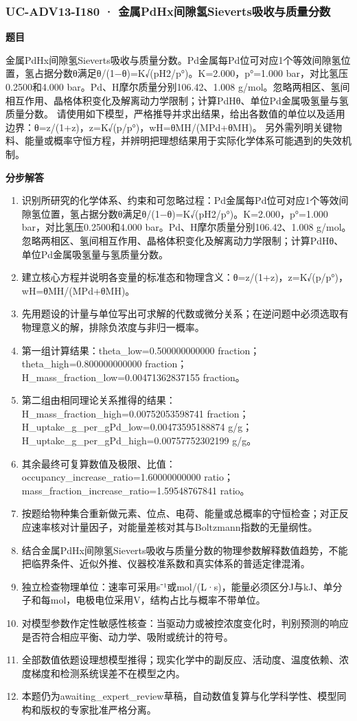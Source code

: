 \documentclass[UTF8,11pt,a4paper]{ctexart}
\begin{document}
\subsubsection*{UC-ADV13-I180 · 金属PdHx间隙氢Sieverts吸收与质量分数}
\noindent\textbf{题目}\par
金属PdHx间隙氢Sieverts吸收与质量分数。Pd金属每Pd位可对应1个等效间隙氢位置，氢占据分数θ满足θ/(1−θ)=K√(pH2/p°)。K=2.000，p°=1.000 bar，对比氢压0.2500和4.000 bar。Pd、H摩尔质量分别106.42、1.008 g/mol。忽略两相区、氢间相互作用、晶格体积变化及解离动力学限制；计算PdHθ、单位Pd金属吸氢量与氢质量分数。 请使用如下模型，严格推导并求出结果，给出各数值的单位以及适用边界：θ=z/(1+z)，z=K√(p/p°)，wH=θMH/(MPd+θMH)。 另外需列明关键物料、能量或概率守恒方程，并辨明把理想结果用于实际化学体系可能遇到的失效机制。\par
\medskip\noindent\textbf{分步解答}
\begin{enumerate}
\item 识别所研究的化学体系、约束和可忽略过程：Pd金属每Pd位可对应1个等效间隙氢位置，氢占据分数θ满足θ/(1−θ)=K√(pH2/p°)。K=2.000，p°=1.000 bar，对比氢压0.2500和4.000 bar。Pd、H摩尔质量分别106.42、1.008 g/mol。忽略两相区、氢间相互作用、晶格体积变化及解离动力学限制；计算PdHθ、单位Pd金属吸氢量与氢质量分数。
\item 建立核心方程并说明各变量的标准态和物理含义：θ=z/(1+z)，z=K√(p/p°)，wH=θMH/(MPd+θMH)。
\item 先用题设的计量与单位写出可求解的代数或微分关系；在逆问题中必须选取有物理意义的解，排除负浓度与非归一概率。
\item 第一组计算结果：theta\_low=0.500000000000 fraction；theta\_high=0.800000000000 fraction；H\_mass\_fraction\_low=0.00471362837155 fraction。
\item 第二组由相同理论关系推得的结果：H\_mass\_fraction\_high=0.00752053598741 fraction；H\_uptake\_g\_per\_gPd\_low=0.00473595188874 g/g；H\_uptake\_g\_per\_gPd\_high=0.00757752302199 g/g。
\item 其余最终可复算数值及极限、比值：occupancy\_increase\_ratio=1.60000000000 ratio；mass\_fraction\_increase\_ratio=1.59548767841 ratio。
\item 按题给物种集合重新做元素、位点、电荷、能量或总概率的守恒检查；对正反应速率核对计量因子，对能量差核对其与Boltzmann指数的无量纲性。
\item 结合金属PdHx间隙氢Sieverts吸收与质量分数的物理参数解释数值趋势，不能把临界条件、近似外推、仪器校准系数和真实体系的普适定律混淆。
\item 独立检查物理单位：速率可采用s⁻¹或mol/(L·s)，能量必须区分J与kJ、单分子和每mol，电极电位采用V，结构占比与概率不带单位。
\item 对模型参数作定性敏感性核查：当驱动力或被控浓度变化时，判别预测的响应是否符合相应平衡、动力学、吸附或统计的符号。
\item 全部数值依题设理想模型推得；现实化学中的副反应、活动度、温度依赖、浓度梯度和检测系统误差不在模型之内。
\item 本题仍为awaiting\_expert\_review草稿，自动数值复算与化学科学性、模型同构和版权的专家批准严格分离。
\end{enumerate}
\end{document}

